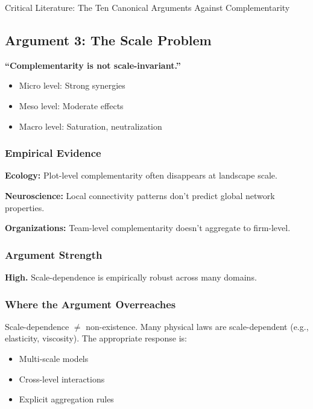 \begin{chapter}{Critical Literature: The Ten Canonical Arguments Against Complementarity}
\subsection{Argument 3: The Scale Problem}
\label{sec:arg-scale}

\begin{tcolorbox}[colback=red!5!white,colframe=red!75!black,title=\textbf{Core Claim}]
\textbf{``Complementarity is not scale-invariant.''}

\begin{itemize}[noitemsep]
    \item Micro level: Strong synergies
    \item Meso level: Moderate effects
    \item Macro level: Saturation, neutralization
\end{itemize}
\end{tcolorbox}

\subsubsection{Empirical Evidence}

\textbf{Ecology:} Plot-level complementarity often disappears at landscape scale.

\textbf{Neuroscience:} Local connectivity patterns don't predict global network properties.

\textbf{Organizations:} Team-level complementarity doesn't aggregate to firm-level.

\subsubsection{Argument Strength}

\textbf{High.} Scale-dependence is empirically robust across many domains.

\subsubsection{Where the Argument Overreaches}

Scale-dependence $\neq$ non-existence. Many physical laws are scale-dependent (e.g., elasticity, viscosity). The appropriate response is:
\begin{itemize}[noitemsep]
    \item Multi-scale models
    \item Cross-level interactions
    \item Explicit aggregation rules
\end{itemize}


\end{chapter}
